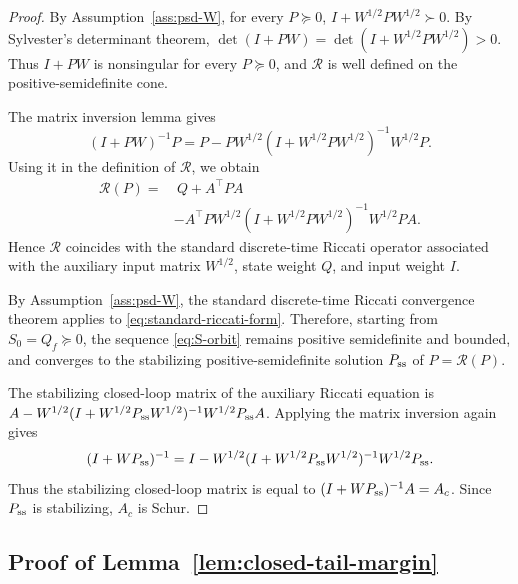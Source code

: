 \documentclass[10pt,journal,twoside]{IEEEtran}
\theoremstyle{definition}
\theoremstyle{remark}
\begin{document}
\begin{proof}
	By Assumption~\ref{ass:psd-W}, for every \(P\succeq0\),
	\(
		I+W^{1/2}PW^{1/2}\succ0 .
	\)
	By Sylvester's determinant theorem,
	\(
		\det(I+PW)
		=
		\det(I+W^{1/2}PW^{1/2})>0 .
	\)
	Thus \(I+PW\) is nonsingular for every \(P\succeq0\), and
	\(\mathcal R\) is well defined on the positive-semidefinite cone.
	
	The matrix inversion lemma gives
	\begin{equation*}
			(I+PW)^{-1}P
			=
			P
			-
			PW^{1/2}
			(I+W^{1/2}PW^{1/2})^{-1}
			W^{1/2}P .
	\end{equation*}
	Using it in the definition of
	\(\mathcal R\), we obtain
	\begin{equation}
		\begin{aligned}
			\mathcal R(P)
			=&
			~Q+A^\top PA\\
			&-\!
			A^\top\! PW^{1/2}
			(I+W^{1/2}PW^{1/2})^{-1}
			W^{1/2}PA .
		\end{aligned}
		\label{eq:standard-riccati-form}
	\end{equation}
	Hence \(\mathcal R\) coincides with the standard discrete-time Riccati
	operator associated with the auxiliary input matrix \(W^{1/2}\), state
	weight \(Q\), and input weight \(I\).
	
    By Assumption~\ref{ass:psd-W}, the standard discrete-time Riccati convergence theorem applies to \eqref{eq:standard-riccati-form}. Therefore, starting from \(S_0=Q_f\succeq0\), the sequence \eqref{eq:S-orbit} remains positive semidefinite and bounded, and converges to the stabilizing positive-semidefinite solution \(P_{\rm ss}\) of \(P=\mathcal R(P)\).
	
	The stabilizing closed-loop matrix of the auxiliary Riccati equation is $A-W^{1/2}(I+W^{1/2}P_{\rm ss}W^{1/2})^{-1}W^{1/2}P_{\rm ss}A$.
	Applying the matrix inversion again gives
	$$
	(I+WP_{\rm ss})^{-1}=I-W^{1/2}(I+W^{1/2}P_{\rm ss}W^{1/2})^{-1}W^{1/2}P_{\rm ss}.
        $$
	Thus the stabilizing closed-loop matrix is equal to
	\((I+WP_{\rm ss})^{-1}A=A_c\). Since \(P_{\rm ss}\) is  stabilizing, \(A_c\) is Schur.
\end{proof}





\subsection{Proof of Lemma~\ref{lem:closed-tail-margin}}
\label{app:lem2}
\end{document}
